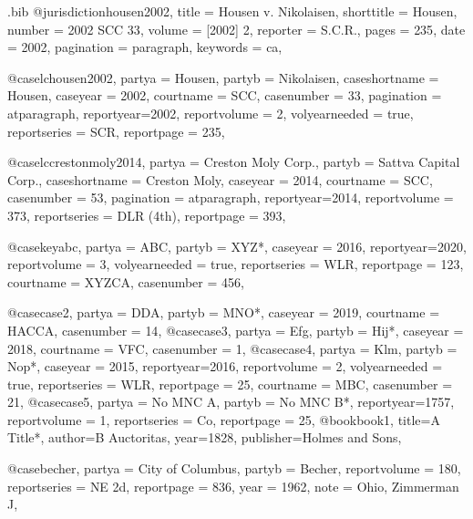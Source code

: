 \begin{filecontents*}[overwrite]{\jobname.bib}
@jurisdiction{housen2002,
title = {Housen v. Nikolaisen},
shorttitle = {Housen},
number = {2002 SCC 33},
volume = {[2002] 2},
reporter = {S.C.R.},
pages = {235},
date = {2002},
pagination = {paragraph},
keywords = {ca},
}

@case{lchousen2002,
  partya = {Housen}, 
  partyb = {Nikolaisen},
  caseshortname = {Housen},
  caseyear = {2002},
  courtname = {SCC},
  casenumber = {33},
  pagination = {atparagraph},
  reportyear={2002},
  reportvolume = {2},
  volyearneeded = {true},
  reportseries = {SCR},
  reportpage = {235},
	}

@case{lccrestonmoly2014,
  partya = {Creston Moly Corp.\@}, 
  partyb = {Sattva Capital Corp.},
  caseshortname = {Creston Moly},
  caseyear = {2014},
  courtname = {SCC},
  casenumber = {53},
  pagination = {atparagraph},
  reportyear={2014},
  reportvolume = {373},
  reportseries = {DLR (4th)},
  reportpage = {393},
	}




@case{keyabc,
  partya = {ABC}, 
  partyb = {XYZ*},
  caseyear = {2016},
  reportyear={2020},
  reportvolume = {3},
  volyearneeded = {true},
  reportseries = {WLR},
  reportpage = {123},
  courtname = {XYZCA},
  casenumber = {456},
	}

@case{case2,
  partya = {DDA}, 
  partyb = {MNO*},
  caseyear = {2019},
  courtname = {HACCA},
  casenumber = {14},
	}
@case{case3,
  partya = {Efg}, 
  partyb = {Hij*},
  caseyear = {2018},
  courtname = {VFC},
  casenumber = {1},
	}
@case{case4,
  partya = {Klm}, 
  partyb = {Nop*},
  caseyear = {2015},
  reportyear={2016},
  reportvolume = {2},
  volyearneeded = {true},
  reportseries = {WLR},
  reportpage = {25},
  courtname = {MBC},
  casenumber = {21},
	}
@case{case5,
  partya = {No MNC A}, 
  partyb = {No MNC B*},
  reportyear={1757},
  reportvolume = {1},
  reportseries = {Co},
  reportpage = {25},
	}
@book{book1,
	title={A Title*},
	author={B Auctoritas},
	year={1828},
	publisher={Holmes and Sons},
	}



@case{becher,
  partya = {City of Columbus}, 
  partyb = {Becher},
  reportvolume = {180},
  reportseries = {NE 2d},
  reportpage = {836},
  year = {1962},
  note = {Ohio, Zimmerman J},
	}



\end{filecontents*}
